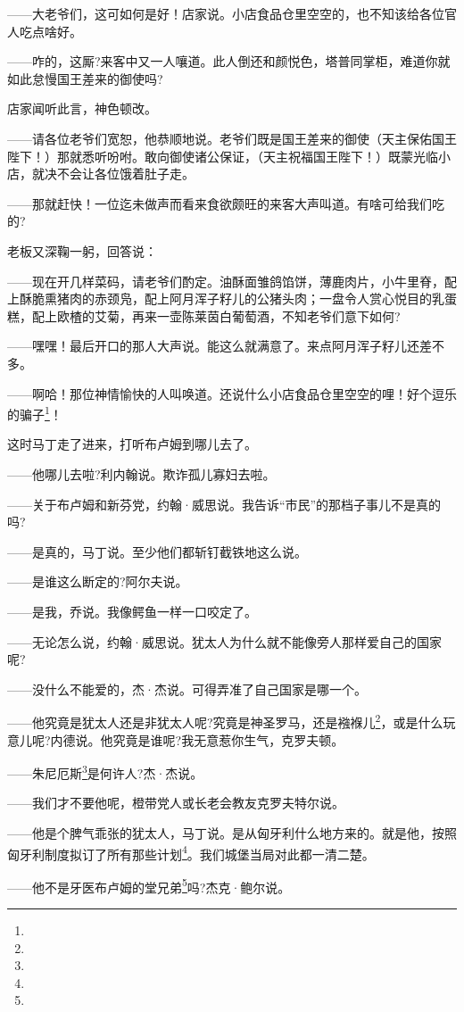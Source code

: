 \par ——大老爷们，这可如何是好！店家说。小店食品仓里空空的，也不知该给各位官人吃点啥好。
\par ——咋的，这厮?来客中又一人嚷道。此人倒还和颜悦色，塔普同掌柜，难道你就如此怠慢国王差来的御使吗?
\par 店家闻听此言，神色顿改。
\par ——请各位老爷们宽恕，他恭顺地说。老爷们既是国王差来的御使（天主保佑国王陛下！）那就悉听吩咐。敢向御使诸公保证，（天主祝福国王陛下！）既蒙光临小店，就决不会让各位饿着肚子走。
\par ——那就赶快！一位迄未做声而看来食欲颇旺的来客大声叫道。有啥可给我们吃的?
\par 老板又深鞠一躬，回答说：
\par ——现在开几样菜码，请老爷们酌定。油酥面雏鸽馅饼，薄鹿肉片，小牛里脊，配上酥脆熏猪肉的赤颈凫，配上阿月浑子籽儿的公猪头肉；一盘令人赏心悦目的乳蛋糕，配上欧楂的艾菊，再来一壶陈莱茵白葡萄酒，不知老爷们意下如何?
\par ——嘿嘿！最后开口的那人大声说。能这么就满意了。来点阿月浑子籽儿还差不多。
\par ——啊哈！那位神情愉快的人叫唤道。还说什么小店食品仓里空空的哩！好个逗乐的骗子\footnote{}！
\par 这时马丁走了进来，打听布卢姆到哪儿去了。
\par ——他哪儿去啦?利内翰说。欺诈孤儿寡妇去啦。
\par ——关于布卢姆和新芬党，约翰·威思说。我告诉“市民”的那档子事儿不是真的吗?
\par ——是真的，马丁说。至少他们都斩钉截铁地这么说。
\par ——是谁这么断定的?阿尔夫说。
\par ——是我，乔说。我像鳄鱼一样一口咬定了。
\par ——无论怎么说，约翰·威思说。犹太人为什么就不能像旁人那样爱自己的国家呢?
\par ——没什么不能爱的，杰·杰说。可得弄准了自己国家是哪一个。
\par ——他究竟是犹太人还是非犹太人呢?究竟是神圣罗马，还是襁褓儿\footnote{}，或是什么玩意儿呢?内德说。他究竟是谁呢?我无意惹你生气，克罗夫顿。
\par ——朱尼厄斯\footnote{}是何许人?杰·杰说。
\par ——我们才不要他呢，橙带党人或长老会教友克罗夫特尔说。
\par ——他是个脾气乖张的犹太人，马丁说。是从匈牙利什么地方来的。就是他，按照匈牙利制度拟订了所有那些计划\footnote{}。我们城堡当局对此都一清二楚。
\par ——他不是牙医布卢姆的堂兄弟\footnote{}吗?杰克·鲍尔说。

